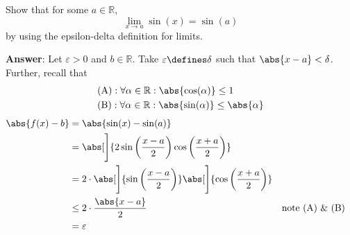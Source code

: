 \begin{exm}\label{exm-epsilon-delta-definition-limit:2}
	Show that for some $a\in\mathbb{R}$,
	\begin{equation*}
		\lim_{x\to a}\sin(x)=\sin(a)
	\end{equation*}
	by using the epsilon-delta definition for limits.
	\begin{flushleft}
		\textbf{Answer}: Let $\varepsilon>0$ and $b\in\mathbb{R}$. Take
		$\varepsilon\defines\delta$ such that $\abs{x-a}<\delta$. Further, recall that
		\begin{align*}
			 & \text{(A)}:\forall\alpha\in\mathbb{R}:\abs{\cos(\alpha)}\leq1            \\
			 & \text{(B)}:\forall\alpha\in\mathbb{R}:\abs{\sin(\alpha)}\leq\abs{\alpha}
		\end{align*}
		\begin{align*}
			\abs{f(x)-b} & =\abs{\sin(x)-\sin(a)}                                                                                                    \\
			             & =\abs[\Bigg]{2\sin\left(\frac{x-a}{2}\right)\cos\left(\frac{x+a}{2}\right)}                                               \\
			             & =2\cdot\abs[\Bigg]{\sin\left(\frac{x-a}{2}\right)}\abs[\Bigg]{\cos\left(\frac{x+a}{2}\right)}                             \\
			             & \leq 2\cdot\frac{\abs{x-a}}{2}                                                                &  & \text{note (A) \& (B)} \\
			             & =\varepsilon
		\end{align*}
	\end{flushleft}
\end{exm}

